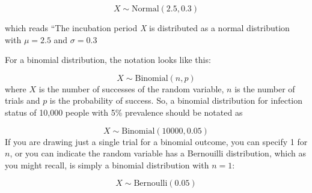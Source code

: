 \documentclass[
]{book}
\begin{document}
\[
X \sim \text{Normal}(2.5, 0.3)
\]

which reads ``The incubation period \emph{X} is distributed as a normal distribution with \(\mu = 2.5\) and \(\sigma = 0.3\)

For a binomial distribution, the notation looks like this:

\[
X\sim \text{Binomial}(n, p)
\]
where \(X\) is the number of successes of the random variable, \(n\) is the number of trials and \(p\) is the probability of success. So, a binomial distribution for infection status of 10,000 people with 5\% prevalence should be notated as

\[
X\sim \text{Binomial}(10000, 0.05)
\]
If you are drawing just a single trial for a binomial outcome, you can specify 1 for \(n\), or you can indicate the random variable has a Bernouilli distribution, which as you might recall, is simply a binomial distribution with \(n = 1\):

\[
X\sim \text{Bernoulli}(0.05)
\]
\end{document}
